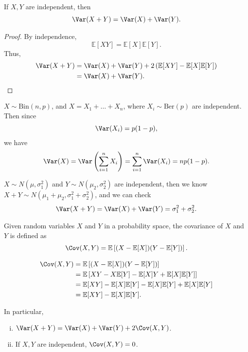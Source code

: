 \begin{corollary}
    If \(X, Y\) are independent, then 
    \[
        \Var(X + Y) = \Var(X) + \Var(Y).
    \] 
\end{corollary}

\begin{proof}
    By independence, 
    \[
        \mathbb{E} [X Y] = \mathbb{E} [X] \mathbb{E} [Y].
    \]
    Thus,
    \begin{align*}
        \Var(X + Y) &= \Var(X) + \Var(Y) + 2 \left( \mathbb{E} [X Y] - \mathbb{E} [X] \mathbb{E} [Y] \right) \\
        &= \Var(X) + \Var(Y). 
    \end{align*}
\end{proof}

\begin{eg}
    \(X \sim \mathrm{Bin}(n, p)\), and \(X = X_1 + \dots + X_n\), where \(X_i \sim \mathrm{Ber}(p) \) are independent. Then since
    \[
        \Var(X_i) = p(1 - p),
    \]   
    we have 
    \[
        \Var(X) = \Var\left( \sum_{i=1}^n X_i  \right) = \sum_{i=1}^n \Var(X_i) = n p (1 - p). 
    \]
\end{eg}

\begin{eg}
    \(X \sim N(\mu , \sigma _1^2)\) and \(Y \sim N(\mu _2, \sigma _2^2)\) are independent, then we know \(X + Y \sim N(\mu _1 + \mu _2, \sigma _1^2 + \sigma _2^2)\), and we can check 
    \[
        \Var(X + Y) = \Var(X) + \Var(Y) = \sigma _1^2 + \sigma _2^2.
    \]   
\end{eg}

\begin{definition}
    Given random variables \(X\) and \(Y\) in a probability space, the covariance of \(X\) and \(Y\) is defined as 
    \[
        \Cov(X, Y) = \mathbb{E} \left[ (X - \mathbb{E} [X])(Y - \mathbb{E} [Y]) \right]. 
    \]    
\end{definition}

\begin{observation}
    \begin{align*}
        \Cov(X, Y) &= \mathbb{E} \left[ (X - \mathbb{E}[X] ) (Y - \mathbb{E} [Y]) \right] \\
        &= \mathbb{E} \left[ XY - X \mathbb{E} [Y] - \mathbb{E} [X] Y + \mathbb{E} [X] \mathbb{E} [Y]  \right] \\
        &= \mathbb{E} [X Y] - \mathbb{E} [X] \mathbb{E} [Y] - \mathbb{E} [X] \mathbb{E} [Y] + \mathbb{E} [X] \mathbb{E} [Y] \\
        &= \mathbb{E} [XY] - \mathbb{E} [X] \mathbb{E} [Y].  
    \end{align*}

    In particular, 
    \begin{enumerate}[(i)]
        \item \(\Var(X + Y) = \Var(X) + \Var(Y) + 2 \Cov(X, Y)\). 
        \item If \(X, Y\) are independent, \(\Cov(X, Y) = 0\).   
    \end{enumerate}
\end{observation}

